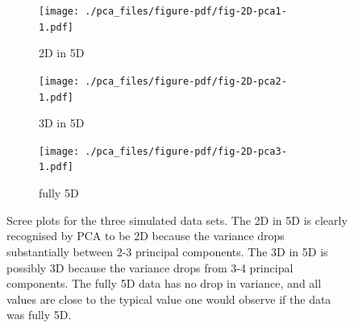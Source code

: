 \documentclass[
  letterpaper,
]{book}
\begin{document}
\begin{figure}

\begin{minipage}[t]{0.33\linewidth}

{\centering 

\begin{figure}

{\centering \texttt{[image: ./pca\_files/figure-pdf/fig-2D-pca1-1.pdf]}

}

\caption{2D in 5D}

\end{figure}

}

\end{minipage}%
%
\begin{minipage}[t]{0.33\linewidth}

{\centering 

\begin{figure}

{\centering \texttt{[image: ./pca\_files/figure-pdf/fig-2D-pca2-1.pdf]}

}

\caption{3D in 5D}

\end{figure}

}

\end{minipage}%
%
\begin{minipage}[t]{0.33\linewidth}

{\centering 

\begin{figure}

{\centering \texttt{[image: ./pca\_files/figure-pdf/fig-2D-pca3-1.pdf]}

}

\caption{fully 5D}

\end{figure}

}

\end{minipage}%

\caption{\label{fig-2D-pca}Scree plots for the three simulated data
sets. The 2D in 5D is clearly recognised by PCA to be 2D because the
variance drops substantially between 2-3 principal components. The 3D in
5D is possibly 3D because the variance drops from 3-4 principal
components. The fully 5D data has no drop in variance, and all values
are close to the typical value one would observe if the data was fully
5D.}

\end{figure}
\end{document}
